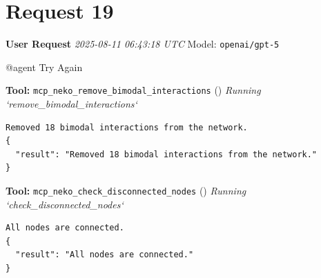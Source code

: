 \documentclass[11pt,a4paper]{article}
\begin{document}
\section{Request 19}
\begin{userbox}
\textbf{User Request}
\quad \textit{2025-08-11 06:43:18 UTC}
\quad Model: \texttt{openai/gpt-5}

@agent Try Again

\end{userbox}
\begin{toolokbox}
\textbf{Tool:} \texttt{mcp\_neko\_remove\_bimodal\_interactions} (\checkmark)
\textit{Running `remove\_bimodal\_interactions`}
\begin{lstlisting}
Removed 18 bimodal interactions from the network.
{
  "result": "Removed 18 bimodal interactions from the network."
}
\end{lstlisting}
\end{toolokbox}
\begin{toolokbox}
\textbf{Tool:} \texttt{mcp\_neko\_check\_disconnected\_nodes} (\checkmark)
\textit{Running `check\_disconnected\_nodes`}
\begin{lstlisting}
All nodes are connected.
{
  "result": "All nodes are connected."
}
\end{lstlisting}
\end{toolokbox}
\end{document}
